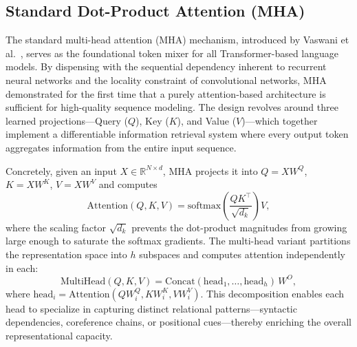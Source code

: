 
\subsection{Standard Dot-Product Attention (MHA)}
\label{subsec:mha}

The standard multi-head attention (MHA) mechanism, introduced by Vaswani et al.~\cite{vaswani2017attention}, serves as the foundational token mixer for all Transformer-based language models. By dispensing with the sequential dependency inherent to recurrent neural networks and the locality constraint of convolutional networks, MHA demonstrated for the first time that a purely attention-based architecture is sufficient for high-quality sequence modeling. The design revolves around three learned projections---Query ($Q$), Key ($K$), and Value ($V$)---which together implement a differentiable information retrieval system where every output token aggregates information from the entire input sequence.

Concretely, given an input $X \in \mathbb{R}^{N \times d}$, MHA projects it into $Q = XW^Q$, $K = XW^K$, $V = XW^V$ and computes
\begin{equation}
\text{Attention}(Q, K, V) = \text{softmax}\!\left(\frac{QK^\top}{\sqrt{d_k}}\right) V,
\label{eq:mha}
\end{equation}
where the scaling factor $\sqrt{d_k}$ prevents the dot-product magnitudes from growing large enough to saturate the softmax gradients. The multi-head variant partitions the representation space into $h$ subspaces and computes attention independently in each:
\begin{equation}
\text{MultiHead}(Q, K, V) = \text{Concat}(\text{head}_1, \ldots, \text{head}_h)\, W^O,
\end{equation}
where $\text{head}_i = \text{Attention}(QW_i^Q, KW_i^K, VW_i^V)$. This decomposition enables each head to specialize in capturing distinct relational patterns---syntactic dependencies, coreference chains, or positional cues---thereby enriching the overall representational capacity.

